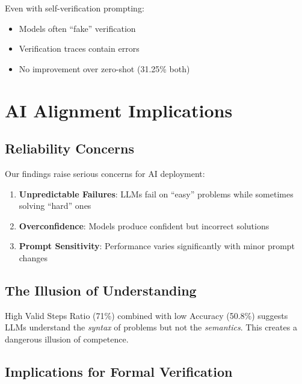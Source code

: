 \documentclass[11pt,a4paper]{article}
\begin{document}
Even with self-verification prompting:
\begin{itemize}
    \item Models often ``fake'' verification
    \item Verification traces contain errors
    \item No improvement over zero-shot (31.25\% both)
\end{itemize}

\section{AI Alignment Implications}

\subsection{Reliability Concerns}

Our findings raise serious concerns for AI deployment:

\begin{enumerate}
    \item \textbf{Unpredictable Failures}: LLMs fail on ``easy'' problems while sometimes solving ``hard'' ones
    \item \textbf{Overconfidence}: Models produce confident but incorrect solutions
    \item \textbf{Prompt Sensitivity}: Performance varies significantly with minor prompt changes
\end{enumerate}

\subsection{The Illusion of Understanding}

\begin{tcolorbox}[colback=red!5,colframe=red!50!black,title=Alignment Warning]
High Valid Steps Ratio (71\%) combined with low Accuracy (50.8\%) suggests LLMs understand the \textit{syntax} of problems but not the \textit{semantics}. This creates a dangerous illusion of competence.
\end{tcolorbox}

\subsection{Implications for Formal Verification}
\end{document}
